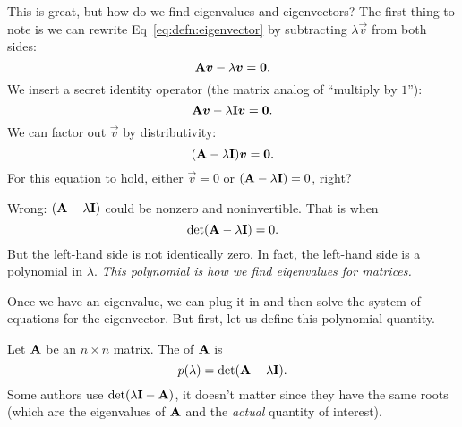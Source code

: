 This is great, but how do we find eigenvalues and eigenvectors?
The first thing to note is we can rewrite Eq~\eqref{eq:defn:eigenvector}
by subtracting $\lambda\vec{v}$ from both sides:
\begin{equation}
\mathbf{A}\boldsymbol{v}-\lambda\boldsymbol{v}=\boldsymbol{0}.
\end{equation}
We insert a secret identity operator (the matrix analog of ``multiply by $1$''):
\begin{equation}
\mathbf{A}\boldsymbol{v}-\lambda\mathbf{I}\boldsymbol{v}=\boldsymbol{0}.
\end{equation}
We can factor out $\vec{v}$ by distributivity:
\begin{equation}
(\mathbf{A}-\lambda\mathbf{I})\boldsymbol{v}=\boldsymbol{0}.
\end{equation}
For this equation to hold, either $\vec{v}=0$ or
$(\mathbf{A}-\lambda\mathbf{I})=0$, right?

Wrong: $(\mathbf{A}-\lambda\mathbf{I})$ could be nonzero and noninvertible.
That is when
\begin{equation}
\det(\mathbf{A}-\lambda\mathbf{I})=0.
\end{equation}
But the left-hand side is not identically zero. In fact, the left-hand
side is a polynomial in $\lambda$.
\emph{This polynomial is how we find eigenvalues for matrices.}

Once we have an eigenvalue, we can plug it in and then solve the system
of equations for the eigenvector. But first, let us define this
polynomial quantity.

\begin{definition}
Let $\mathbf{A}$ be an $n\times n$ matrix.
The  of $\mathbf{A}$ is 
\begin{equation}
p(\lambda) = \det(\mathbf{A}-\lambda\mathbf{I}).
\end{equation}
Some authors use $\det(\lambda\mathbf{I}-\mathbf{A})$, it doesn't matter since
they have the same roots (which are the eigenvalues of $\mathbf{A}$ and the
\emph{actual} quantity of interest).
\end{definition}

